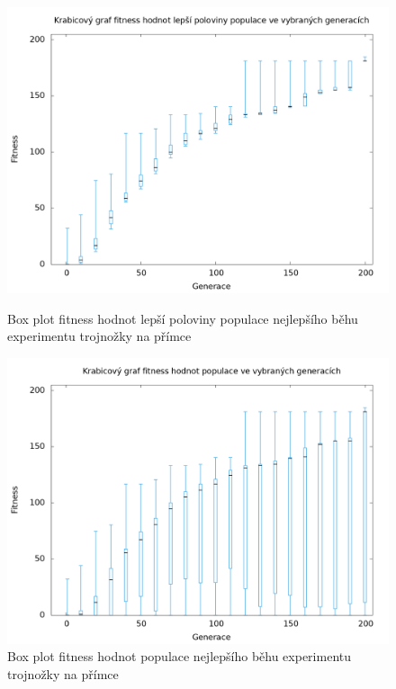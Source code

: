 \begin{figure}[h]
    \begin{minipage}[c]{0.48\linewidth}
        \includegraphics[width=\linewidth]{obrazky/bar_whisker_trojnozka_primka_top50.png}
        \caption{Box plot fitness hodnot lepší poloviny populace nejlepšího běhu experimentu trojnožky na přímce}
        \label{fig:bar_whisker_trojnozka_primka_top50}
    \end{minipage}
    \hfill
    \begin{minipage}[c]{0.48\linewidth}
        \includegraphics[width=\linewidth]{obrazky/bar_whisker_trojnozka_primka.png}
        \caption{Box plot fitness hodnot populace nejlepšího běhu experimentu trojnožky na přímce}
        \label{fig:bar_whisker_trojnozka_primka}
    \end{minipage}
\end{figure}

